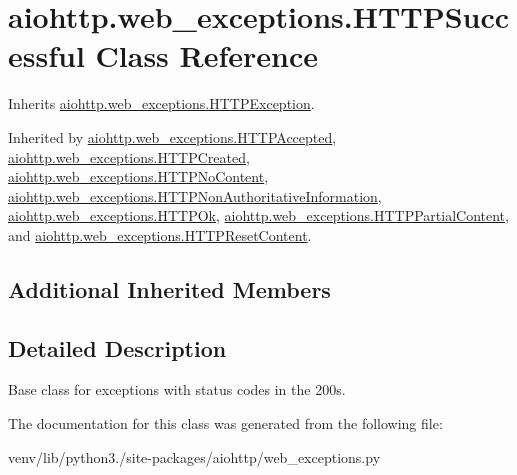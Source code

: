 \hypertarget{classaiohttp_1_1web__exceptions_1_1_h_t_t_p_successful}{}\section{aiohttp.\+web\+\_\+exceptions.\+H\+T\+T\+P\+Successful Class Reference}
\label{classaiohttp_1_1web__exceptions_1_1_h_t_t_p_successful}


Inherits \hyperlink{classaiohttp_1_1web__exceptions_1_1_h_t_t_p_exception}{aiohttp.\+web\+\_\+exceptions.\+H\+T\+T\+P\+Exception}.



Inherited by \hyperlink{classaiohttp_1_1web__exceptions_1_1_h_t_t_p_accepted}{aiohttp.\+web\+\_\+exceptions.\+H\+T\+T\+P\+Accepted}, \hyperlink{classaiohttp_1_1web__exceptions_1_1_h_t_t_p_created}{aiohttp.\+web\+\_\+exceptions.\+H\+T\+T\+P\+Created}, \hyperlink{classaiohttp_1_1web__exceptions_1_1_h_t_t_p_no_content}{aiohttp.\+web\+\_\+exceptions.\+H\+T\+T\+P\+No\+Content}, \hyperlink{classaiohttp_1_1web__exceptions_1_1_h_t_t_p_non_authoritative_information}{aiohttp.\+web\+\_\+exceptions.\+H\+T\+T\+P\+Non\+Authoritative\+Information}, \hyperlink{classaiohttp_1_1web__exceptions_1_1_h_t_t_p_ok}{aiohttp.\+web\+\_\+exceptions.\+H\+T\+T\+P\+Ok}, \hyperlink{classaiohttp_1_1web__exceptions_1_1_h_t_t_p_partial_content}{aiohttp.\+web\+\_\+exceptions.\+H\+T\+T\+P\+Partial\+Content}, and \hyperlink{classaiohttp_1_1web__exceptions_1_1_h_t_t_p_reset_content}{aiohttp.\+web\+\_\+exceptions.\+H\+T\+T\+P\+Reset\+Content}.

\subsection*{Additional Inherited Members}


\subsection{Detailed Description}
\begin{DoxyVerb}Base class for exceptions with status codes in the 200s.\end{DoxyVerb}
 

The documentation for this class was generated from the following file\+:\begin{DoxyCompactItemize}
\item 
venv/lib/python3./site-\/packages/aiohttp/web\+\_\+exceptions.\+py\end{DoxyCompactItemize}

